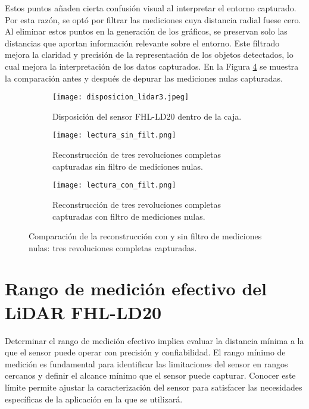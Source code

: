 Estos puntos añaden cierta confusión visual al interpretar el entorno capturado. Por esta razón, se optó por filtrar las mediciones cuya distancia radial fuese cero. Al eliminar estos puntos en la generación de los gráficos, se preservan solo las distancias que aportan información relevante sobre el entorno. Este filtrado mejora la claridad y precisión de la representación de los objetos detectados, lo cual mejora la interpretación de los datos capturados. En la Figura \ref{fig: comparación_con_sin_filt} se muestra la comparación antes y después de depurar las mediciones nulas capturadas.

\begin{figure}[H]
	\centering
	\begin{subfigure}{0.6\textwidth}
		\centering
		\texttt{[image: disposicion\_lidar3.jpeg]}
		\caption{Disposición del sensor FHL-LD20 dentro de la caja.}
		\label{disposicion_lidar3}
		\vspace{1em}
	\end{subfigure}
	\begin{subfigure}{0.45\textwidth}
		\centering
		\texttt{[image: lectura\_sin\_filt.png]}
		\caption{Reconstrucción de tres revoluciones completas capturadas sin filtro de mediciones nulas.}
		\label{lectura_sin_filt}
	\end{subfigure}
	\hspace{1em}
	\begin{subfigure}{0.45\textwidth}
		\centering
		\texttt{[image: lectura\_con\_filt.png]}
		\caption{Reconstrucción de tres revoluciones completas capturadas con filtro de mediciones nulas.}
		\label{lectura_con_filt}
	\end{subfigure}
	\caption{Comparación de la reconstrucción con y sin filtro de mediciones nulas: tres revoluciones completas capturadas.}
	\label{fig: comparación_con_sin_filt}
\end{figure}

\section{Rango de medición efectivo del LiDAR FHL-LD20}
\label{minima_dist}
Determinar el rango de medición efectivo implica evaluar la distancia mínima a la que el sensor puede operar con precisión y confiabilidad. El rango mínimo de medición es fundamental para identificar las limitaciones del sensor en rangos cercanos y definir el alcance mínimo que el sensor puede capturar. Conocer este límite permite ajustar la caracterización del sensor para satisfacer las necesidades específicas de la aplicación en la que se utilizará.

